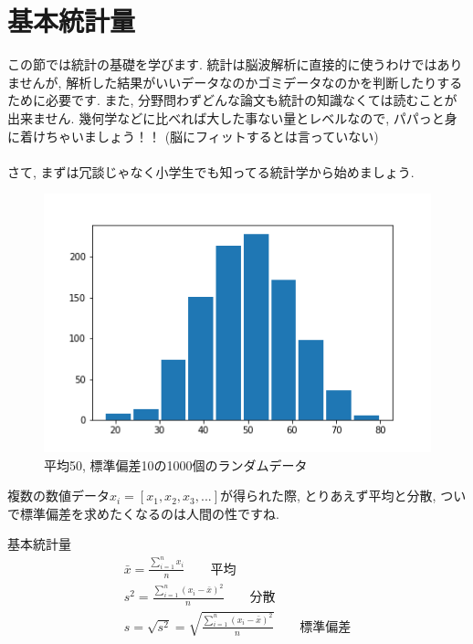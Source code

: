 \documentclass[11pt,a4paper,uplatex]{ujreport}
\begin{document}
\section{基本統計量}
この節では統計の基礎を学びます. 統計は脳波解析に直接的に使うわけではありませんが, 解析した結果がいいデータなのかゴミデータなのかを判断したりするために必要です. また, 分野問わずどんな論文も統計の知識なくては読むことが出来ません. 幾何学などに比べれば大した事ない量とレベルなので, パパっと身に着けちゃいましょう！！ (脳にフィットするとは言っていない)\\
\\
さて, まずは冗談じゃなく小学生でも知ってる統計学から始めましょう.\\

\begin{figure}[H]
\label{im:histgram}
  \centering
  \includegraphics[width=120mm,bb=0 0 432 288]{../figures/hist.png}
  \caption{平均50, 標準偏差10の1000個のランダムデータ}
\end{figure}

複数の数値データ$x_i = [x_1, x_2, x_3, ...]$が得られた際, とりあえず平均と分散, ついで標準偏差を求めたくなるのは人間の性ですね.\\

\begin{screen}
基本統計量
\begin{eqnarray}
\label{eq:ave}
\bar{x} = \frac{\sum_{i=1}^{n} x_i}{n}  \qquad \text{平均}\\
\label{eq:var}
s^2 = \frac{\sum_{i=1}^{n} (x_i - \bar{x})^2}{n} \qquad \text{分散}\\
\label{eq:dev}
s = \sqrt{s^2} = \sqrt{\frac{\sum_{i=1}^{n} (x_i - \bar{x})^2}{n}} \qquad \text{標準偏差}
\end{eqnarray}
\end{screen}
\end{document}
